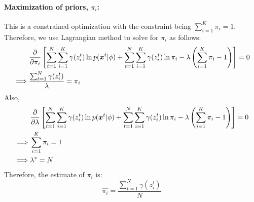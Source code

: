 \paragraph{Maximization of priors, $\pi_i$:} This is a constrained optimization with the constraint being $\sum_{i=1}^{K}\pi_i = 1$. Therefore, we use Lagrangian method to solve for $\pi_i$ as follows:
\begin{equation*}
	\begin{split}
		&\frac{\partial}{\partial \pi_i}\left[\sum_{t=1}^{N} \sum_{i=1}^{K} \gamma(z^t_i)\ln p(\boldsymbol{x}^t|\phi) + \sum_{t=1}^{N} \sum_{i=1}^{K} \gamma(z^t_i)\ln \pi_i - \lambda\left(\sum_{i=1}^{K}\pi_i-1\right)\right] = 0\\
		\implies & \frac{\sum_{t=1}^{N}\gamma(z^t_i)}{\lambda} = \pi_i
	\end{split}
\end{equation*}
Also,
\begin{equation*}
\begin{split}
	&\frac{\partial}{\partial \lambda}\left[\sum_{t=1}^{N} \sum_{i=1}^{K} \gamma(z^t_i)\ln p(\boldsymbol{x}^t|\phi) + \sum_{t=1}^{N} \sum_{i=1}^{K} \gamma(z^t_i)\ln \pi_i - \lambda\left(\sum_{i=1}^{K}\pi_i-1\right)\right] = 0\\
	\implies & \sum_{i=1}^{K} \pi_i = 1\\
	\implies & \lambda^* = N
	\end{split}
\end{equation*}
Therefore, the estimate of $\pi_i$ is:
\begin{equation*}
	\hat{\pi_i} = \frac{\sum_{t=1}^{N}\gamma(z^t_i)}{N}
\end{equation*}
